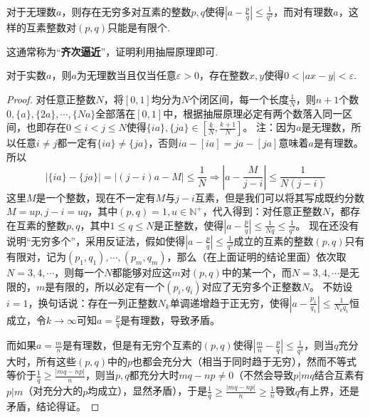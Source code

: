 \documentclass[../../main.tex]{subfiles}
\begin{document}
\begin{theorem}[狄利克雷定理]\label{theorem:狄利克雷定理}
对于无理数\(a\)，则存在无穷多对互素的整数\(p,q\)使得\(\left|a - \frac{p}{q}\right|\leqslant \frac{1}{q^2}\)，而对有理数\(a\)，这样的互素整数对\((p,q)\)只能是有限个.
\end{theorem}
\begin{note}
这通常称为“\textbf{齐次逼近}”，证明利用抽屉原理即可.
\end{note}

\begin{corollary}
对于实数\(a\)，则\(a\)为无理数当且仅当任意\(\varepsilon>0\)，存在整数\(x,y\)使得\(0 < |ax - y| < \varepsilon\).
\end{corollary}
\begin{proof}
对任意正整数\(N\)，将\([0,1]\)均分为\(N\)个闭区间，每一个长度\(\frac{1}{N}\)，则\(n + 1\)个数\(0,\{a\},\{2a\},\cdots,\{Na\}\)全部落在\([0,1]\)中，根据抽屉原理必定有两个数落入同一区间，也即存在\(0\leqslant  i < j\leqslant  N\)使得\(\{ia\},\{ja\}\in\left[\frac{k}{N},\frac{k + 1}{N}\right]\)。
注：因为\(a\)是无理数，所以任意\(i\neq j\)都一定有\(\{ia\}\neq\{ja\}\)，否则\(ia - [ia]=ja - [ja]\)意味着\(a\)是有理数。
所以
\[|\{ia\} - \{ja\}|=|(j - i)a - M|\leqslant \frac{1}{N}\Rightarrow\left|a - \frac{M}{j - i}\right|\leqslant \frac{1}{N(j - i)}\]
这里\(M\)是一个整数，现在不一定有\(M\)与\(j - i\)互素，但是我们可以将其写成既约分数\(M = up,j - i = uq\)，其中\((p,q)=1,u\in\mathbb{N}^+\)，代入得到：对任意正整数\(N\)，都存在互素的整数\(p,q\)，其中\(1\leqslant  q\leqslant  N\)是正整数，使得\(\left|a - \frac{p}{q}\right|\leqslant \frac{1}{Nq}\leqslant \frac{1}{q^2}\)。
现在还没有说明“无穷多个”，采用反证法，假如使得\(\left|a - \frac{p}{q}\right|\leqslant \frac{1}{q^2}\)成立的互素的整数\((p,q)\)只有有限对，记为\((p_1,q_1),\cdots,(p_m,q_m)\)，那么（在上面证明的结论里面）依次取\(N = 3,4,\cdots\)，则每一个\(N\)都能够对应这\(m\)对\((p,q)\)中的某一个，而\(N = 3,4,\cdots\)是无限的，\(m\)是有限的，所以必定有一个\((p_i,q_i)\)对应了无穷多个正整数\(N\)。
不妨设\(i = 1\)，换句话说：存在一列正整数\(N_k\)单调递增趋于正无穷，使得\(\left|a - \frac{p_1}{q_1}\right|\leqslant \frac{1}{N_kq_1}\)恒成立，令\(k\to\infty\)可知\(a = \frac{p}{q}\)是有理数，导致矛盾。

而如果\(a=\frac{m}{n}\)是有理数，但是有无穷个互素的\((p,q)\)使得\(\left|\frac{m}{n}-\frac{p}{q}\right|\leqslant \frac{1}{q^2}\)，则当\(q\)充分大时，所有这些\((p,q)\)中的\(p\)也都会充分大（相当于同时趋于无穷），然而不等式等价于\(\frac{1}{q}\geqslant \frac{|mq - np|}{n}\)，则当\(p,q\)都充分大时\(mq - np\neq0\)（不然会导致\(p|mq\)结合互素有\(p|m\)（对充分大的\(p\)均成立），显然矛盾），于是\(\frac{1}{q}\geqslant \frac{|mq - np|}{n}\geqslant \frac{1}{n}\)导致\(q\)有上界，还是矛盾，结论得证。
\end{proof}
\end{document}
